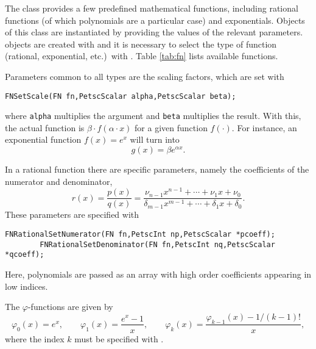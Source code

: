 The  class provides a few predefined mathematical functions, including rational functions (of which polynomials are a particular case) and exponentials. Objects of this class are instantiated by providing the values of the relevant parameters.  objects are created with  and it is necessary to select the type of function (rational, exponential, etc.)\ with . Table \ref{tab:fn} lists available functions.

Parameters common to all  types are the scaling factors, which are set with
	\begin{Verbatim}[fontsize=\small]
        FNSetScale(FN fn,PetscScalar alpha,PetscScalar beta);
	\end{Verbatim}
where \texttt{alpha} multiplies the argument and \texttt{beta} multiplies the result. With this, the actual function is $\beta\cdot f(\alpha\cdot x)$ for a given function $f(\cdot)$. For instance, an exponential function $f(x)=e^x$ will turn into
\begin{equation}
g(x)=\beta e^{\alpha x}.
\end{equation}

In a rational function there are specific parameters, namely the coefficients of the numerator and denominator,
\begin{equation}
r(x)=\frac{p(x)}{q(x)}
=\frac{\nu_{n-1}x^{n-1}+\cdots+\nu_1x+\nu_0}{\delta_{m-1}x^{m-1}+\cdots+\delta_1x+\delta_0}.
\end{equation}
These parameters are specified with
	\begin{Verbatim}[fontsize=\small]
        FNRationalSetNumerator(FN fn,PetscInt np,PetscScalar *pcoeff);
        FNRationalSetDenominator(FN fn,PetscInt nq,PetscScalar *qcoeff);
	\end{Verbatim}
Here, polynomials are passed as an array with high order coefficients appearing in low indices.

The $\varphi$-functions are given by
\begin{equation}
\varphi_0(x)=e^x,\qquad \varphi_1(x)=\frac{e^x-1}{x},\qquad \varphi_k(x)=\frac{\varphi_{k-1}(x)-1/(k-1)!}{x},
\end{equation}
where the index $k$ must be specified with .

